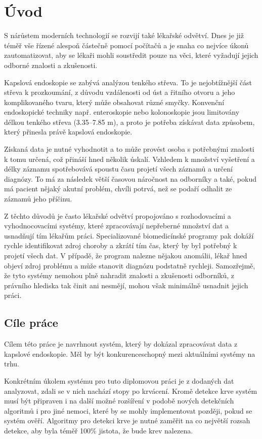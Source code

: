\chapter{Úvod}
S nárůstem moderních technologií se rozvijí také lékařské odvětví. Dnes je již téměř vše řízené alespoň částečně pomocí počítačů a je snaha co nejvíce úkonů zautomatizovat, aby se lékaři mohli soustředit pouze na věci, které vyžadují jejich odborné znalosti a zkušenosti.

Kapslová endoskopie se zabývá analýzou tenkého střeva. To je nejobtížnější část střeva k prozkoumání, z důvodu vzdálenosti od úst a řitního otvoru a jeho komplikovaného tvaru, který může obsahovat různé smyčky. Konvenční endoskopické techniky např. enteroskopie nebo kolonoskopie jsou limitovány délkou tenkého střeva (3.35–7.85 m)\cite{randomized}, a proto je potřeba získávat data způsobem, který přinesla právě kapslová endoskopie.

Získaná data je nutné vyhodnotit a to může provést osoba s potřebnými znalosti k tomu určená, což přináší hned několik úskalí. Vzhledem k množství vyšetření a délky záznamu spotřebovává spoustu času projetí všech záznamů a určení diagnózy. To má za následek větší časovou náročnost na odborníky a také, pokud má pacient nějaký akutní problém, chvíli potrvá, než se podaří odhalit ze záznamů jeho příčinu.

Z těchto důvodů je často lékařské odvětví propojováno s rozhodovacími a vyhodnocovacími systémy, které zpracovávají nepřeberné množství dat a usnadňují tím lékařům práci. Specializované biomedicínské programy pak dokáží rychle identifikovat zdroj choroby a zkrátí tím čas, který by byl potřebný k projetí všech dat. V případě, že program nalezne nějakou anomálii, lékař hned objeví zdroj problému a může stanovit diagnózu podstatně rychleji. Samozřejmě, že tyto systémy nemohou plně nahradit znalosti a zkušenosti odborníků, z právního hlediska tak činit ani nesmějí, mohou však minimálně usnadnit jejich práci.

\section{Cíle práce}
Cílem této práce je navrhnout systém, který by dokázal zpracovávat data z kapslové endoskopie. Měl by být konkurenceschopný mezi aktuálními systémy na trhu.

Konkrétním úkolem systému pro tuto diplomovou práci je z dodaných dat analyzovat, zdali se v nich nachází stopy po krvácení. Kromě detekce krve systém musí být připraven i na další možné rozšíření v podobě nových detekčních algoritmů i pro jiné nemoci, které by se mohly implementovat později, pokud se systém ověří. Algoritmy pro detekci krve je nutné zaměřit na co největší rozsah detekce, aby byla téměř 100\% jistota, že bude krev nalezena.

